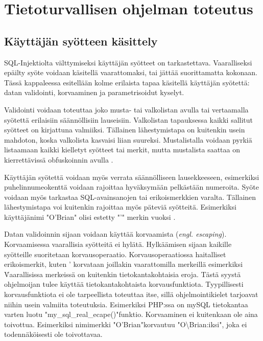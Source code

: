 \documentclass[finnish]{tktltiki2}
\theoremstyle{definition}
\theoremstyle{remark}
\begin{document}
	\section {Tietoturvallisen ohjelman toteutus}
	\subsection{Käyttäjän syötteen käsittely}
		SQL-Injektiolta välttymiseksi käyttäjän syötteet on tarkastettava. Vaaralliseksi epäilty syöte voidaan käsitellä vaarattomaksi, tai jättää suorittamatta kokonaan. Tässä kappaleessa esitellään kolme erilaista tapaa käsitellä käyttäjän syötettä: datan validointi, korvaaminen ja parametrisoidut kyselyt.
		
		 Validointi voidaan toteuttaa joko musta- tai valkolistan avulla tai vertaamalla syötettä erilaisiin säännöllisiin lauseisiin. Valkolistan tapauksessa kaikki sallitut syötteet on kirjattuna valmiiksi. Tällainen lähestymistapa on kuitenkin usein mahdoton, koska valkolista kasvaisi liian suureksi. Mustalistalla voidaan pyrkiä listaamaan kaikki kielletyt syötteet tai merkit, mutta mustalista saattaa on kierrettävissä obfuskoinnin avulla \cite{encoding}. 
		
		Käyttäjän syötettä voidaan myös verrata säännölliseen lausekkeeseen, esimerkiksi puhelinnumeokenttä voidaan rajoittaa hyväksymään pelkästään numeroita. Syöte voidaan myös tarkastaa SQL-avainsanojen tai erikoismerkkien varalta. Tällainen lähestymistapa voi kuitenkin rajoittaa myös päteviä syötteitä. Esimerkiksi käyttäjänimi "O'Brian" olisi estetty "'" merkin vuoksi \cite{validointi}.
		
		Datan validoinnin sijaan voidaan käyttää korvaamista (\textit{engl. escaping}). Korvaamisessa vaarallisia syötteitä ei hylätä. Hylkäämisen sijaan kaikille syötteille suoritetaan korvausoperaatio. Korvausoperaatiossa haitalliset erikoismerkit, kuten ' korvataan joillakin vaarattomilla merkeillä esimerkiksi \. Vaarallisissa merkeissä on kuitenkin tietokantakohtaisia eroja. Tästä syystä ohjelmoijan tulee käyttää tietokantakohtaista korvausfunktiota. Tyypillisesti korvausfunktiota ei ole tarpeellista toteuttaa itse, sillä ohjelmointikielet tarjoavat niihin usein valmiita toteutuksia. Esimerkiksi PHP:ssa on mySQL tietokantaa varten luotu "my{\_}sql{\_}real{\_}ecape()"\space funktio. Korvaaminen ei kuitenkaan ole aina toivottua. Esimerkiksi nimimerkki "O'Brian"\space korvautuu "O\textbackslash Brian:iksi", joka ei todennäköisesti ole toivottavaa.
		
\end{document}
